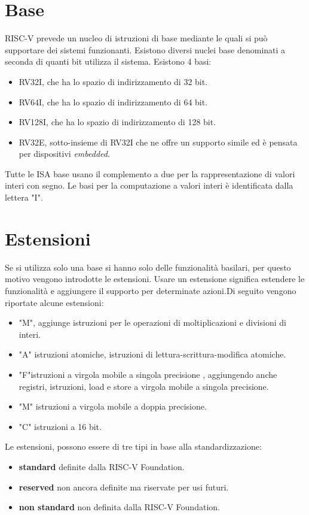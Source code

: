\documentclass[12pt,a4paper]{report}
\begin{document}
\section{Base}
RISC-V prevede un nucleo di istruzioni di base mediante le quali si può supportare dei sistemi funzionanti. Esistono diversi nuclei base denominati a seconda di quanti bit utilizza il sistema.  Esistono 4 basi:
\begin{itemize}
	\item RV32I, che ha lo spazio di indirizzamento di 32 bit.  
	\item RV64I, che ha lo spazio di indirizzamento di 64 bit.
	\item RV128I, che ha lo spazio di indirizzamento di 128 bit.
	\item RV32E,  sotto-insieme di RV32I che ne offre un supporto simile ed è pensata  per dispositivi \textit{embedded}.
\end{itemize}
Tutte le ISA base usano il complemento a due per la rappresentazione di valori interi con segno.  Le basi per la computazione a valori interi è identificata dalla lettera "I". 

\section{Estensioni}
Se si utilizza solo una base si hanno solo delle funzionalità basilari, per questo motivo vengono introdotte le estensioni. Usare un estensione significa estendere le funzionalità e aggiungere il supporto per determinate azioni.Di seguito vengono riportate alcune estensioni:
\begin{itemize}
		\item "M", aggiunge istruzioni per le operazioni di moltiplicazioni e divisioni di interi.
		\item "A" istruzioni atomiche,  istruzioni di lettura-scrittura-modifica atomiche. %
		\item "F"istruzioni a virgola mobile a singola precisione , aggiungendo anche registri, istruzioni, load e store a virgola mobile a singola precisione.
		\item "M" istruzioni a virgola mobile a doppia precisione.
		\item "C" istruzioni a 16 bit.
\end{itemize}

Le estensioni, possono essere di tre tipi in base alla standardizzazione:
\begin{itemize}
	\item \textbf{standard} definite dalla RISC-V Foundation.
	\item \textbf{reserved} non ancora definite ma riservate per usi futuri.
	\item \textbf{non standard} non definita dalla RISC-V Foundation.
\end{itemize}
\end{document}
